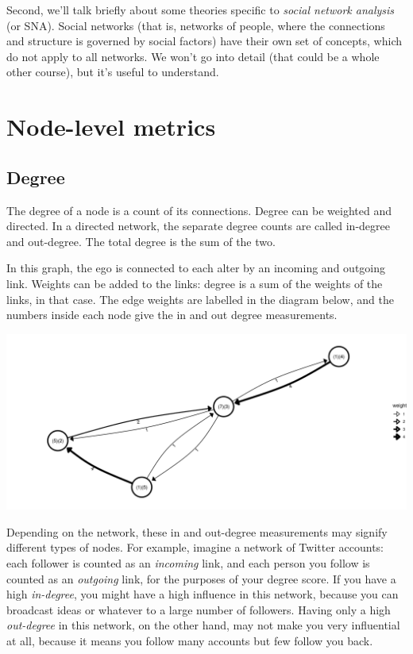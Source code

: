 \documentclass[
]{book}
\begin{document}
Second, we'll talk briefly about some theories specific to \emph{social network analysis} (or SNA). Social networks (that is, networks of people, where the connections and structure is governed by social factors) have their own set of concepts, which do not apply to all networks. We won't go into detail (that could be a whole other course), but it's useful to understand.

\hypertarget{node-level-metrics}{%
\section{Node-level metrics}\label{node-level-metrics}}

\hypertarget{degree}{%
\subsection{Degree}\label{degree}}

The degree of a node is a count of its connections. Degree can be weighted and directed. In a directed network, the separate degree counts are called in-degree and out-degree. The total degree is the sum of the two.

In this graph, the ego is connected to each alter by an incoming and outgoing link. Weights can be added to the links: degree is a sum of the weights of the links, in that case. The edge weights are labelled in the diagram below, and the numbers inside each node give the in and out degree measurements.

\includegraphics{images/degree.png}

Depending on the network, these in and out-degree measurements may signify different types of nodes. For example, imagine a network of Twitter accounts: each follower is counted as an \emph{incoming} link, and each person you follow is counted as an \emph{outgoing} link, for the purposes of your degree score. If you have a high \emph{in-degree}, you might have a high influence in this network, because you can broadcast ideas or whatever to a large number of followers. Having only a high \emph{out-degree} in this network, on the other hand, may not make you very influential at all, because it means you follow many accounts but few follow you back.
\end{document}
